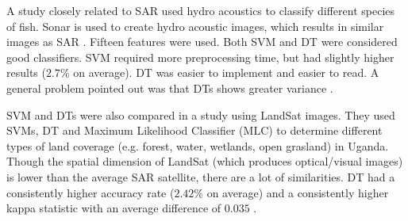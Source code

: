 A study closely related to SAR used hydro acoustics to classify different species of fish. Sonar is used to create hydro acoustic images, which results in similar images as SAR \cite{griffiths2003synthetic}. Fifteen features were used. Both SVM and DT were considered good classifiers. SVM required more preprocessing time, but had slightly higher results ($2.7$\% on average). DT was easier to implement and easier to read. A general problem pointed out was that DTs shows greater variance \cite{Robotham2011170}.

SVM and DTs were also compared in a study using LandSat images. They used SVMs, DT and Maximum Likelihood Classifier (MLC) to determine different types of land coverage (e.g. forest, water, wetlands, open grasland) in Uganda. Though the spatial dimension of LandSat (which produces optical/visual images) is lower than the average SAR satellite, there are a lot of similarities. DT had a consistently higher accuracy rate ($2.42$\% on average) and a consistently higher kappa statistic with an average difference of $0.035$ \cite{Otukei2010S27}.
